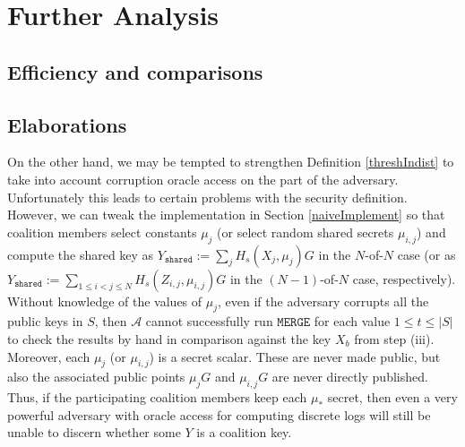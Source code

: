 \documentclass[12pt,english,oneside]{mrl}
\theoremstyle{definition}
\numberwithin{equation}{section}
\numberwithin{figure}{section}
\numberwithin{equation}{section}
\numberwithin{equation}{section}
\numberwithin{figure}{section}
\begin{document}



\section{Further Analysis}

\subsection{Efficiency and comparisons}

\subsection{Elaborations}


 
 On the other hand, we may be tempted to strengthen Definition \ref{threshIndist} to take into account corruption oracle access on the part of the adversary. Unfortunately this leads to certain problems with the security definition. However, we can tweak the implementation in Section \ref{naiveImplement} so that coalition members select constants $\mu_j$ (or select random shared secrets $\mu_{i,j}$) and compute the shared key as $Y_{\texttt{shared}} := \sum_j H_s(X_j, \mu_j)G$ in the $N$-of-$N$ case (or as $Y_{\texttt{shared}} := \sum_{1 \leq i < j \leq N} H_s(Z_{i,j}, \mu_{i,j})G$ in the $(N-1)$-of-$N$ case, respectively). Without knowledge of the values of $\mu_j$, even if the adversary corrupts all the public keys in $S$, then $\mathcal{A}$ cannot successfully run $\texttt{MERGE}$ for each value $1 \leq t \leq \left|S\right|$ to check the results by hand in comparison against the key $X_b$ from step (iii). Moreover, each $\mu_j$ (or $\mu_{i,j}$) is a secret scalar. These are never made public, but also the associated public points $\mu_j G$ and $\mu_{i,j} G$ are never directly published. Thus, if the participating coalition members keep each $\mu_*$ secret, then even a very powerful adversary with oracle access for computing discrete logs will still be unable to discern whether some $Y$ is a coalition key.
\end{document}
